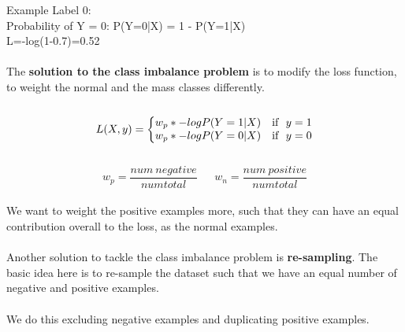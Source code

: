 \documentclass[a4paper,12pt]{article}
\begin{document}
Example Label 0:\\
Probability of Y = 0: P(Y=0|X) = 1 - P(Y=1|X)\\
L=-log(1-0.7)=0.52
\\
\\
The \textbf{solution to the class imbalance problem} is to modify the loss function, to weight the normal and the mass classes differently. 
\\\\
\begin{equation}
L(X,y)=\left\{
\begin{array}{@{}ll@{}}
w_p * -log P(Y=1|X) & \text{if}\ \ y=1 \nonumber \\
w_p * -log P(Y=0|X) & \text{if}\ \ y=0
\end{array}\right.
\end{equation}
\\
\[ w_p=\frac{num\ negative}{num total} \ \ \textrm{ }
\ \ w_n=\frac{num\ positive}{num total} \]
\\
We want to weight the positive examples more, such that they can have an equal contribution overall to the loss, as the normal examples.\\
\\
Another solution to tackle the class imbalance problem is \textbf{re-sampling}. The basic idea here is to re-sample the dataset such that we have an equal number of negative and positive examples.\\
\\
We do this excluding negative examples and duplicating positive examples.
\end{document}
